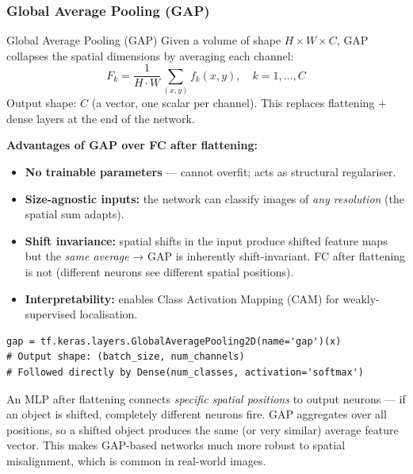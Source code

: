\documentclass[11pt,a4paper]{article}
\begin{document}
\subsubsection{Global Average Pooling (GAP)}

\begin{defbox}{Global Average Pooling (GAP)}
Given a volume of shape $H \times W \times C$, GAP collapses the spatial dimensions by averaging each channel:
\[
F_k = \frac{1}{H\cdot W}\sum_{(x,y)} f_k(x,y), \quad k=1,\ldots,C
\]
Output shape: $C$ (a vector, one scalar per channel). This replaces flattening + dense layers at the end of the network.
\end{defbox}

\begin{tcolorbox}[colback=LightBlue,colframe=AccentBlue,boxrule=0.8pt,arc=3pt]
\textbf{Advantages of GAP over FC after flattening:}
\begin{itemize}
  \item \textbf{No trainable parameters} — cannot overfit; acts as structural regulariser.
  \item \textbf{Size-agnostic inputs:} the network can classify images of \emph{any resolution} (the spatial sum adapts).
  \item \textbf{Shift invariance:} spatial shifts in the input produce shifted feature maps but the \emph{same average} → GAP is inherently shift-invariant. FC after flattening is not (different neurons see different spatial positions).
  \item \textbf{Interpretability:} enables Class Activation Mapping (CAM) for weakly-supervised localisation.
\end{itemize}
\end{tcolorbox}

\begin{lstlisting}[caption={GAP layer in Keras}]
gap = tf.keras.layers.GlobalAveragePooling2D(name='gap')(x)
# Output shape: (batch_size, num_channels)
# Followed directly by Dense(num_classes, activation='softmax')
\end{lstlisting}

\begin{insightbox}
An MLP after flattening connects \emph{specific spatial positions} to output neurons — if an object is shifted, completely different neurons fire. GAP aggregates over all positions, so a shifted object produces the same (or very similar) average feature vector. This makes GAP-based networks much more robust to spatial misalignment, which is common in real-world images.
\end{insightbox}
\end{document}
